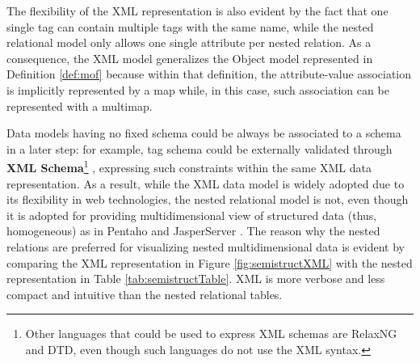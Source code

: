 The flexibility of the XML representation is also evident by the fact that one single tag can contain multiple tags with the same name, while the nested relational model only allows one single attribute per nested relation. As a consequence, the XML model generalizes the Object model represented in Definition \vref{def:mof} because within that definition, the attribute-value association is implicitly represented by a map while, in this case, such association can be represented with a multimap.

Data models having no fixed schema could be always be associated to a schema in a later step: for example, tag schema could be externally validated through \textbf{XML Schema}\footnote{Other languages that could be used to express XML schemas are RelaxNG and DTD, even though such languages do not use the XML syntax.} \cite{VlistXS}, expressing such constraints within the same XML data representation. As a result, while the XML data model is widely adopted due to its flexibility in web technologies, the nested relational model is not, even though it is adopted for providing multidimensional view of structured data (thus, homogeneous) as in Pentaho \cite{Pentaho} and JasperServer \cite{Parra}. The reason why the nested relations are preferred for visualizing nested multidimensional data is evident by comparing the XML representation in Figure \ref{fig:semistructXML} with the nested representation in Table \ref{tab:semistructTable}. XML is more verbose and less compact and intuitive than  the nested relational tables.




